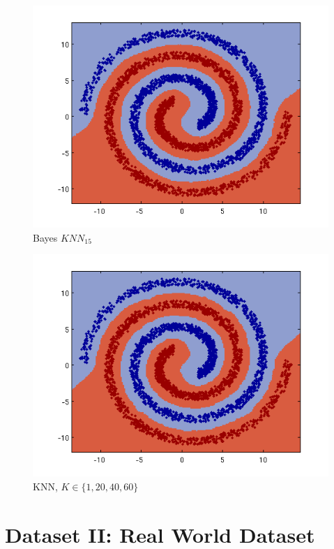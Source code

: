 \documentclass[a4paper]{article}
\begin{document}
\begin{figure}[htbp!]
\center
\includegraphics[clip, trim=40px 15px 30px 10px]{bayes_knn_nls.png}
\caption{Bayes $KNN_{15}$}
\end{figure}

\begin{figure}[htbp!]
\center
\includegraphics[clip, trim=40px 15px 30px 10px]{knn_nls.png}
\caption{KNN, $K \in \{1,20,40,60\}$}
\end{figure}






\newpage
\section{Dataset II: Real World Dataset}
\end{document}

